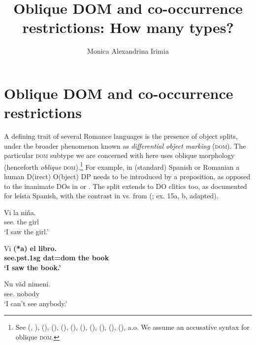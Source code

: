 \documentclass[output=paper,colorlinks,citecolor=brown,draft,draftmode]{langscibook}
\author{Monica Alexandrina Irimia\orcid{https://orcid.org/0000-0003-3733-8163}\affiliation{University of Modena and Reggio Emilia}}
\title{Oblique DOM and co-occurrence restrictions: How many types?}
\begin{document}
\maketitle
\section{Oblique DOM and co-occurrence restrictions}\label{sec:irimia:section1Intro}

A defining trait of several Romance languages is the presence of object splits, under the broader phenomenon known as \textit{differential object marking} (\textsc{dom)}. The particular \textsc{dom} subtype we are concerned with here uses oblique morphology (henceforth \textit{oblique} \textsc{dom}).\footnote{See \citeauthor{boss91} (\citeyear{boss91}, \citeyear{boss98}), \citeauthor{torrego98dependency} (\citeyear{torrego98dependency}), \citeauthor{cornil00} (\citeyear{cornil00}),  \citeauthor{ais2003} (\citeyear{ais2003}), \citeauthor{rodmondon07} (\citeyear{rodmondon07}),  \citeauthor{tig11} (\citeyear{tig11}), \citeauthor{lopez12} (\citeyear{lopez12}),
\citeauthor{ormromero13} (\citeyear{ormromero13}), \citeauthor{manzfranco16} (\citeyear{manzfranco16}), \citeauthor{hillandmardale2021} (\citeyear{hillandmardale2021}), a.o. We assume an accusative syntax for oblique \textsc{dom}.} For example,
in (standard) Spanish  or Romanian  a  human D(irect) O(bject) DP needs to be introduced by a preposition, as opposed to the inanimate DOs in  or . The split extends to DO clitics too, as documented for leísta Spanish, with the contrast in  vs.  from \citeauthor{ormromero07} (\citeyear{ormromero07}; ex. 15a, b, adapted).



\ea \label{ex:irimia:SpanishAnimDOMPrep}
\gll Vi  la ni\~na. \\
see.  the girl \\
\glt `I saw the girl.'
\z

\ea \label{ex:irimia:SpanishInanimNoDOM}
\gll Vi \bf {(*a)} el libro. \\
see.{\sc pst.1sg} {\sc dat=dom} the book\\ 
\glt `I saw the book.'
\z

\ea \label{ex:irimia:RomanianDOM}
\gll Nu v\u ad  nimeni.\\
 see.  nobody\\
\glt `I can't see anybody.'
\z
\end{document}
